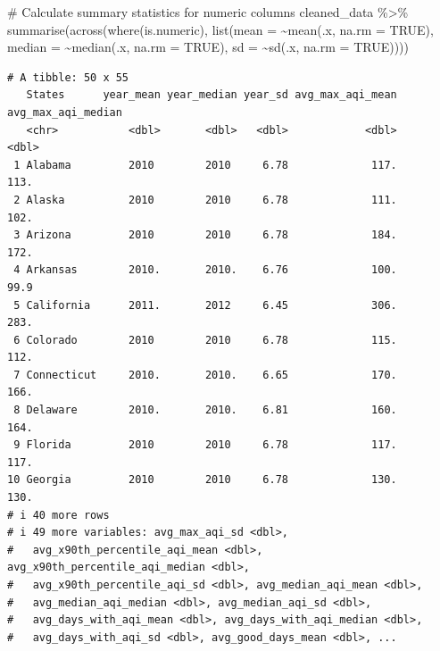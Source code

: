 \documentclass[
  12pt,
]{article}
\newenvironment{Shaded}{\begin{snugshade}}{\end{snugshade}}
\newcommand{\AttributeTok}[1]{\textcolor[rgb]{0.40,0.45,0.13}{#1}}
\newcommand{\CommentTok}[1]{\textcolor[rgb]{0.37,0.37,0.37}{#1}}
\newcommand{\ConstantTok}[1]{\textcolor[rgb]{0.56,0.35,0.01}{#1}}
\newcommand{\FunctionTok}[1]{\textcolor[rgb]{0.28,0.35,0.67}{#1}}
\newcommand{\NormalTok}[1]{\textcolor[rgb]{0.00,0.23,0.31}{#1}}
\newcommand{\SpecialCharTok}[1]{\textcolor[rgb]{0.37,0.37,0.37}{#1}}
\begin{document}
\begin{Shaded}
\begin{Highlighting}[]
\CommentTok{\# Calculate summary statistics for numeric columns}
\NormalTok{cleaned\_data }\SpecialCharTok{\%\textgreater{}\%}
  \FunctionTok{summarise}\NormalTok{(}\FunctionTok{across}\NormalTok{(}\FunctionTok{where}\NormalTok{(is.numeric), }\FunctionTok{list}\NormalTok{(}\AttributeTok{mean =} \SpecialCharTok{\textasciitilde{}}\FunctionTok{mean}\NormalTok{(.x, }\AttributeTok{na.rm =} \ConstantTok{TRUE}\NormalTok{), }
                                           \AttributeTok{median =} \SpecialCharTok{\textasciitilde{}}\FunctionTok{median}\NormalTok{(.x, }\AttributeTok{na.rm =} \ConstantTok{TRUE}\NormalTok{), }
                                           \AttributeTok{sd =} \SpecialCharTok{\textasciitilde{}}\FunctionTok{sd}\NormalTok{(.x, }\AttributeTok{na.rm =} \ConstantTok{TRUE}\NormalTok{))))}
\end{Highlighting}
\end{Shaded}

\begin{verbatim}
# A tibble: 50 x 55
   States      year_mean year_median year_sd avg_max_aqi_mean avg_max_aqi_median
   <chr>           <dbl>       <dbl>   <dbl>            <dbl>              <dbl>
 1 Alabama         2010        2010     6.78             117.              113. 
 2 Alaska          2010        2010     6.78             111.              102. 
 3 Arizona         2010        2010     6.78             184.              172. 
 4 Arkansas        2010.       2010.    6.76             100.               99.9
 5 California      2011.       2012     6.45             306.              283. 
 6 Colorado        2010        2010     6.78             115.              112. 
 7 Connecticut     2010.       2010.    6.65             170.              166. 
 8 Delaware        2010.       2010.    6.81             160.              164. 
 9 Florida         2010        2010     6.78             117.              117. 
10 Georgia         2010        2010     6.78             130.              130. 
# i 40 more rows
# i 49 more variables: avg_max_aqi_sd <dbl>,
#   avg_x90th_percentile_aqi_mean <dbl>, avg_x90th_percentile_aqi_median <dbl>,
#   avg_x90th_percentile_aqi_sd <dbl>, avg_median_aqi_mean <dbl>,
#   avg_median_aqi_median <dbl>, avg_median_aqi_sd <dbl>,
#   avg_days_with_aqi_mean <dbl>, avg_days_with_aqi_median <dbl>,
#   avg_days_with_aqi_sd <dbl>, avg_good_days_mean <dbl>, ...
\end{verbatim}
\end{document}
